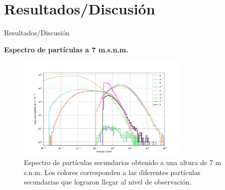     \section{Resultados/Discusión}
    \begin{frame}{Resultados/Discusión} %
        \justifying %
        \vspace*{-0.4cm} %
        
        \begin{tcolorbox}[colback=custombgcolor3, coltext=customfgcolor2,
                      colframe=custombgcolor3, %
                      width=\textwidth,       %
                      boxrule=1pt,            %
                      top=0.1mm, bottom=0.1mm,     %
                      sharp corners=all,     %
                      halign=center,         %
                      valign=center,         %
                      ]
            \textbf{Espectro de partículas a 7 m.s.n.m.}        
        \end{tcolorbox}
        \vspace*{-0.4cm} %
        
        \begin{figure}
            \centering
            \includegraphics[width=0.74\textwidth]{Figures/Thesis_flux_new2_7msnm_without_title.png}
            \caption{\tiny Espectro de partículas secundarias obtenido a una altura de 7 m s.n.m.  Los colores corresponden a las diferentes partículas secundarias que lograron llegar al nivel de observación.}
        \end{figure}
    \end{frame}     
    
